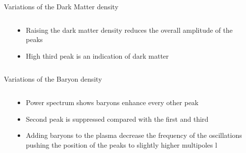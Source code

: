 \documentclass{beamer}
\begin{document}
\begin{frame}{Variations of the Dark Matter density}
\begin{columns}
  \begin{column}{6cm}
\end{column}
		\begin{column}{4cm}
		\begin{itemize}
		    \item Raising the dark matter density reduces the overall amplitude of the peaks
		    \item  High third peak is an indication of dark matter
		\end{itemize}

\end{column}
	\end{columns}
\end{frame}

\begin{frame}{Variations of the Baryon density}
  \begin{center}
  
  \begin{columns}
		\begin{column}{6cm}
		\end{column}
		\begin{column}{4cm}
			\begin{itemize}
			\small
			    \item Power spectrum shows baryons enhance every other peak
			    \item  Second peak is suppressed compared with the first and third
			    \item Adding baryons to the plasma decrease the frequency of the oscillations pushing the position of the peaks to slightly higher multipoles l
			\end{itemize}
		\end{column}
	\end{columns}
   
\end{center}
\end{frame}
\end{document}
